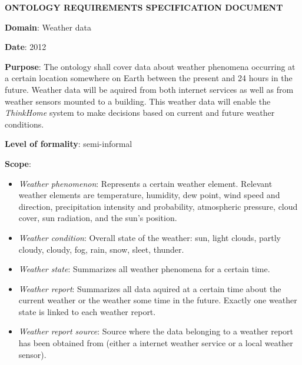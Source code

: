 \begin{mdframed}
\setlength{\parindent}{0pt}
\MakeUppercase{\textbf{Ontology requirements specification document}}

\vspace{.5cm}

\textbf{Domain}: Weather data

\vspace{.2cm}

\textbf{Date}: 2012 %

\vspace{.2cm}

\textbf{Purpose}: The ontology shall cover data about weather phenomena occurring at a certain location somewhere on Earth between the present and 24 hours in the future. Weather data will be aquired from both internet services as well as from weather sensors mounted to a building. This weather data will enable the \textit{ThinkHome} system to make decisions based on current and future weather conditions.

\vspace{.2cm}

\textbf{Level of formality}: semi-informal %

\vspace{.2cm}

\textbf{Scope}:

\begin{itemize}
  \item \emph{Weather phenomenon}: Represents a certain weather element. Relevant weather elements are temperature, humidity, dew point, wind speed and direction, precipitation intensity and probability, atmospheric pressure, cloud cover, sun radiation, and the sun's position.

  \item \emph{Weather condition}: Overall state of the weather: sun, light clouds, partly cloudy, cloudy, fog, rain, snow, sleet, thunder.
  \item \emph{Weather state}: Summarizes all weather phenomena for a certain time. 
  \item \emph{Weather report}: Summarizes all data aquired at a certain time about the current weather or the weather some time in the future. Exactly one weather state is linked to each weather report.
  \item \emph{Weather report source}: Source where the data belonging to a weather report has been obtained from (either a internet weather service or a local weather sensor).
\end{itemize}


\end{mdframed}
